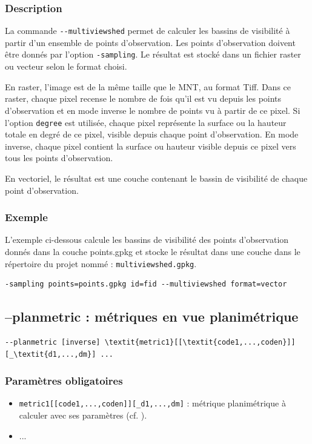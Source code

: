 \documentclass{report}
\begin{document}
\subsubsection{Description}
La commande \verb|--multiviewshed| permet de calculer les bassins de visibilité à partir d'un ensemble de points d'observation. Les points d'observation doivent être donnés par l'option \verb|-sampling|. Le résultat est stocké dans un fichier raster ou vecteur selon le format choisi. 

En raster, l'image est de la même taille que le MNT, au format Tiff. Dans ce raster, chaque pixel recense le nombre de fois qu'il est vu depuis les points d'observation et en mode inverse le nombre de points vu à partir de ce pixel. Si l'option \verb|degree| est utilisée, chaque pixel représente la surface ou la hauteur totale en degré de ce pixel, visible depuis chaque point d'observation. En mode inverse, chaque pixel contient la surface ou hauteur visible depuis ce pixel vers tous les points d'observation.

En vectoriel, le résultat est une couche contenant le bassin de visibilité de chaque point d'observation.

\subsubsection{Exemple}
L'exemple ci-dessous calcule les bassins de visibilité des points d'observation donnés dans la couche points.gpkg et stocke le résultat dans une couche dans le répertoire du projet nommé : \verb|multiviewshed.gpkg|.
\begin{Verbatim}
-sampling points=points.gpkg id=fid --multiviewshed format=vector
\end{Verbatim}


\subsection{--planmetric : métriques en vue planimétrique}

\begin{Verbatim}[commandchars=\\\{\}]
--planmetric [inverse] \textit{metric1}[[\textit{code1,...,coden}]][_\textit{d1,...,dm}] ...
\end{Verbatim}

\subsubsection{Paramètres obligatoires}
\begin{itemize}
	\item \verb|metric1[[code1,...,coden]][_d1,...,dm]| : métrique planimétrique à calculer avec ses paramètres (cf. ).
	\item ...
\end{itemize}
\end{document}
